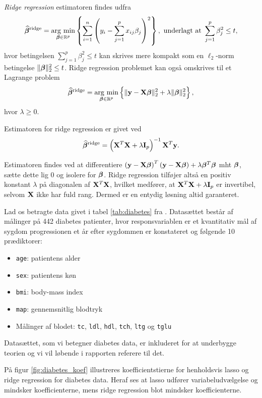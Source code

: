 \textit{Ridge regression} estimatoren findes udfra 
\begin{align} 
\widehat{\tbeta}^\text{ridge} = \argmin_{\tbeta \in \R^p} \cbr{\sum_{i=1}^n \del{y_i - \sum_{j=1}^p x_{ij} \beta_j}^2}, \ \text{underlagt at } \sum_{j=1}^p \beta_j^2 \leq t, \label{eq:2.7} 
\end{align} 
hvor betingelsen $\sum_{j=1}^p \beta_j^2 \leq t$ kan skrives mere kompakt som en \(\ell_2\)-norm betingelse $\Vert \boldsymbol{\beta} \Vert_2^2 \leq t$.
Ridge regression problemet kan også omskrives til et Lagrange problem
\begin{align*}
\widehat{\tbeta}^\text{ridge} = \argmin_{\tbeta \in \R^p} \cbr{ \Vert \y - \X \tbeta \Vert_2^2 + \lambda \Vert \tbeta \Vert_2^2},
\end{align*}
hvor $\lambda \geq 0$.
\begin{defn}
Estimatoren for ridge regression er givet ved
\begin{align} 
\widehat{\tbeta}^\text{ridge} = \del{\X^T \X + \lambda \mathbf{I}_p}^{-1} \X^T \y. \label{eq:ridge_estimator}
\end{align} 
\end{defn}
Estimatoren findes ved at differentiere \(\del{\y - \X \tbeta}^T \del{\y - \X \tbeta} + \lambda \tbeta^T \tbeta\) mht $\boldsymbol{\beta}$, sætte dette lig 0 og isolere for $\boldsymbol{\beta}$.
Ridge regression tilføjer altså en positiv konstant $\lambda$ på diagonalen af $\mathbf{X}^T \mathbf{X}$, hvilket medfører, at \(\mathbf{X}^T \mathbf{X} + \lambda \mathbf{I}_p\) er invertibel, selvom $\mathbf{X}$ ikke har fuld rang. 
Dermed er en entydig løsning altid garanteret. 
%
\begin{exmp}
Lad os betragte data givet i tabel \ref{tab:diabetes} fra \citep{efron}.
Datasættet består af målinger på 442 diabetes patienter, hvor responsvariablen er et kvantitativ mål af sygdom progressionen et år efter sygdommen er konstateret og følgende 10 prædiktorer: 
\begin{itemize}
\item \texttt{age}: patientens alder
\item \texttt{sex}: patientens køn
\item \texttt{bmi}: body-mass index
\item \texttt{map}: gennemsnitlig blodtryk
\item Målinger af blodet:  \texttt{tc},  \texttt{ldl}, \texttt{hdl}, \texttt{tch}, \texttt{ltg} og \texttt{tglu}
\end{itemize}
%

%
Datasættet, som vi betegner diabetes data, er inkluderet for at underbygge teorien og vi vil løbende i rapporten referere til det.
\end{exmp}
%
På figur \ref{fig:diabetes_koef} illustreres koefficientstierne for henholdsvis lasso og ridge regression for diabetes data.
Heraf ses at lasso udfører variabeludvælgelse og mindsker koefficienterne, mens ridge regression blot mindsker koefficienterne.
%

